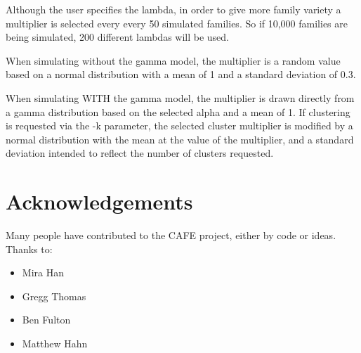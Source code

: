 \documentclass{article}
\begin{document}
Although the user specifies the lambda, in order to give more
family variety a multiplier is selected every every 50 simulated families. So if 10,000 families are being simulated, 200 different lambdas will be used.

When simulating without the gamma model, the multiplier is a
random value based on a normal distribution
with a mean of 1 and a standard deviation of 0.3.

When simulating WITH the gamma model, the multiplier is drawn 
directly from a gamma distribution based on the selected alpha
and a mean of 1. If clustering is requested via the -k parameter,
the selected cluster multiplier is modified by a normal distribution
with the mean at the value of the multiplier, and a standard
deviation intended to reflect the number of clusters requested.

\section{Acknowledgements}
Many people have contributed to the CAFE project, either by code or ideas. Thanks to:
\begin{itemize}
  \item Mira Han
  \item Gregg Thomas
  \item Ben Fulton
  \item Matthew Hahn
\end{itemize}


\end{document}
